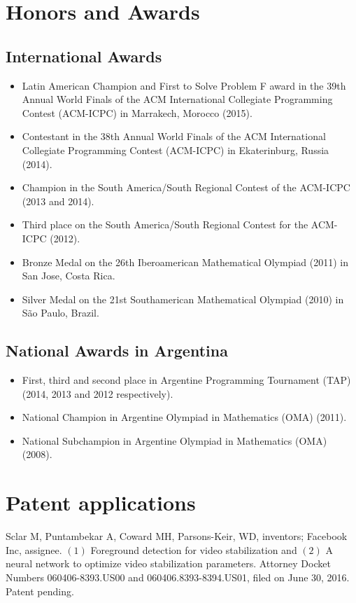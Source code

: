 \documentclass [a4paper, 11pt]{article}
\begin{document}
\newpage
\section* {Honors and Awards}

\subsection* {International Awards}

\begin{itemize} \itemsep.05cm
	\item[] Latin American Champion and First to Solve Problem F award in the 39th Annual World Finals of the ACM International Collegiate Programming Contest (ACM-ICPC) in Marrakech, Morocco (2015).
	\item[] Contestant in the 38th Annual World Finals of the ACM International Collegiate Programming Contest (ACM-ICPC) in Ekaterinburg, Russia (2014).
	\item[] Champion in the South America/South Regional Contest of the ACM-ICPC (2013 and 2014).
	\item[] Third place on the South America/South Regional Contest for the ACM-ICPC (2012).
	\item[] Bronze Medal on the 26th Iberoamerican Mathematical Olympiad (2011) in San Jose, Costa Rica.
	\item[] Silver Medal on the 21st Southamerican Mathematical Olympiad (2010) in S\~ao Paulo, Brazil. 
\end{itemize}

\subsection* {National Awards in Argentina}

\begin{itemize} \itemsep.05cm
    \item[] First, third and second place in Argentine Programming Tournament (TAP) (2014, 2013 and 2012 respectively).
	\item[] National Champion in Argentine Olympiad in Mathematics (OMA) (2011).
	\item[] National Subchampion in Argentine Olympiad in Mathematics (OMA) (2008).
	
\end{itemize}

\section* {Patent applications}
Sclar M, Puntambekar A, Coward MH, Parsons-Keir, WD, inventors; Facebook Inc,
assignee. $(1)$ Foreground detection for video stabilization and $(2)$ A neural network to optimize video stabilization parameters. Attorney Docket Numbers 060406-8393.US00 and 060406.8393-8394.US01, filed on June 30, 2016. Patent pending.
\end{document}
